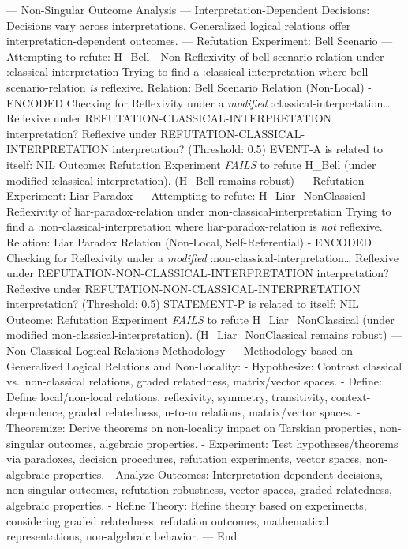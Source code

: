 --- Non-Singular Outcome Analysis --- Interpretation-Dependent
Decisions: Decisions vary across interpretations. Generalized logical
relations offer interpretation-dependent outcomes. --- Refutation
Experiment: Bell Scenario --- Attempting to refute: H\_Bell -
Non-Reflexivity of bell-scenario-relation under
:classical-interpretation Trying to find a :classical-interpretation
where bell-scenario-relation \emph{is} reflexive. Relation: Bell
Scenario Relation (Non-Local) - ENCODED Checking for Reflexivity under a
\emph{modified} :classical-interpretation\ldots{} Reflexive under
REFUTATION-CLASSICAL-INTERPRETATION interpretation? Reflexive under
REFUTATION-CLASSICAL-INTERPRETATION interpretation? (Threshold: 0.5)
EVENT-A is related to itself: NIL Outcome: Refutation Experiment
\emph{FAILS} to refute H\_Bell (under modified
:classical-interpretation). (H\_Bell remains robust) --- Refutation
Experiment: Liar Paradox --- Attempting to refute: H\_Liar\_NonClassical
- Reflexivity of liar-paradox-relation under
:non-classical-interpretation Trying to find a
:non-classical-interpretation where liar-paradox-relation is \emph{not}
reflexive. Relation: Liar Paradox Relation (Non-Local, Self-Referential)
- ENCODED Checking for Reflexivity under a \emph{modified}
:non-classical-interpretation\ldots{} Reflexive under
REFUTATION-NON-CLASSICAL-INTERPRETATION interpretation? Reflexive under
REFUTATION-NON-CLASSICAL-INTERPRETATION interpretation? (Threshold: 0.5)
STATEMENT-P is related to itself: NIL Outcome: Refutation Experiment
\emph{FAILS} to refute H\_Liar\_NonClassical (under modified
:non-classical-interpretation). (H\_Liar\_NonClassical remains robust)
--- Non-Classical Logical Relations Methodology --- Methodology based on
Generalized Logical Relations and Non-Locality: - Hypothesize: Contrast
classical vs.~non-classical relations, graded relatedness, matrix/vector
spaces. - Define: Define local/non-local relations, reflexivity,
symmetry, transitivity, context-dependence, graded relatedness, n-to-m
relations, matrix/vector spaces. - Theoremize: Derive theorems on
non-locality impact on Tarskian properties, non-singular outcomes,
algebraic properties. - Experiment: Test hypotheses/theorems via
paradoxes, decision procedures, refutation experiments, vector spaces,
non-algebraic properties. - Analyze Outcomes: Interpretation-dependent
decisions, non-singular outcomes, refutation robustness, vector spaces,
graded relatedness, algebraic properties. - Refine Theory: Refine theory
based on experiments, considering graded relatedness, refutation
outcomes, mathematical representations, non-algebraic behavior. --- End
